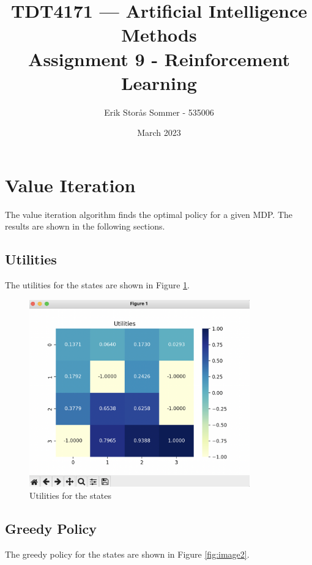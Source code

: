 \documentclass{article}
\title{TDT4171 — Artificial Intelligence Methods \\ Assignment 9 - Reinforcement Learning}
\author{Erik Storås Sommer - 535006}
\date{March 2023}
\begin{document}
\maketitle
\setlength{\parindent}{0pt}

\section*{Value Iteration}

The value iteration algorithm finds the optimal policy for a given MDP.
The results are shown in the following sections.

\subsection*{Utilities}

The utilities for the states are shown in Figure \ref{fig:image1}.

\begin{figure}[hbtp]
    \centering
    \includegraphics[width=0.85\textwidth]{images/utilities.png}
    \caption{Utilities for the states}
    \label{fig:image1}
\end{figure}

\newpage

\subsection*{Greedy Policy}

The greedy policy for the states are shown in Figure \ref{fig:image2}.
\end{document}

